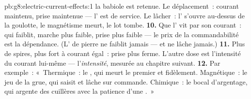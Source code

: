 \begin{solution}{pb:g8:electric-current-effects:1}
la babiole est retenue. Le déplacement~: courant maintenu, prise
maintenue --- l' est de service. Le lâcher~:
l' s'ouvre au-dessus de la goulotte, le magnétisme meurt,
le lot tombe.
\textbf{10.} Que l' vit par son courant~:  qui
faiblit, marche plus faible, prise plus faible --- le prix de la
commandabilité est la dépendance. (L' de pierre ne faiblit
jamais --- et ne lâche jamais.)
\textbf{11.} Plus de spires,  plus fort à courant égal~: prise
plus ferme. L'autre dose est l'intensité du courant lui-même ---
l'\emph{intensité}, mesurée au chapitre suivant.
\textbf{12.} Par exemple~: «~Thermique~: le , qui meurt le
premier et fidèlement. Magnétique~: le jeu de la grue, qui saisit et
lâche sur commande. Chimique~: le bocal d'argentage, qui argente des
cuillères avec la patience d'une .~»
\end{solution}
